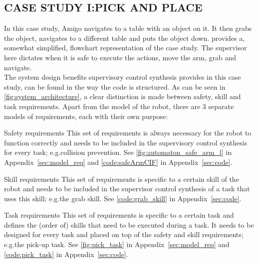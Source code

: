

\subsection{CASE STUDY I:\@ PICK AND PLACE}\label{sec:cs1}
In this case study, Amigo navigates to a table with an object on it. 
It then grabs the object, navigates to a different table and puts the object down.
 provides a, somewhat simplified, flowchart representation of the case study.
The supervisor here dictates when it is safe to execute the actions, move the arm, grab and navigate.\\

The system design benefits supervisory control synthesis provides in this case study, can be found in the way the code is structured. 
As can be seen in \cref{fig:system_architecture}, a clear distinction is made between safety, skill and task requirements. 
Apart from the model of the robot, there are 3 separate models of requirements, each with their own purpose:\\

\begin{LaTeXdescription}
  \item [Safety requirements] This set of requirements is always necessary for the robot to function correctly and needs to be included in the supervisory control synthesis for every task; e.g.\@ collision prevention. See \cref{fig:automaton_safe_arm_l} in Appendix~\ref{sec:model_req} and \cref{code:safeArmCIF} in Appendix~\ref{sec:code}. 
  \item [Skill requirements] This set of requirements is specific to a certain skill of the robot and needs to be included in the supervisor control synthesis of a task that uses this skill; e.g.\@ the grab skill. See \cref{code:grab_skill} in Appendix~\ref{sec:code}.
  \item [Task requirements] This set of requirements is specific to a certain task and defines the (order of) skills that need to be executed during a task. It needs to be designed for every task and placed on top of the safety and skill requirements; e.g.\@ the pick-up task. See \cref{fig:pick_task} in Appendix~\ref{sec:model_req} and \cref{code:pick_task} in Appendix~\ref{sec:code}.\\%
\end{LaTeXdescription}


